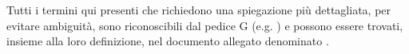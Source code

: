 Tutti i termini qui presenti che richiedono una spiegazione più dettagliata, per evitare ambiguit\`a,
sono riconoscibili dal pedice G (e.g. )
e possono essere trovati, insieme alla loro definizione, nel documento allegato denominato .